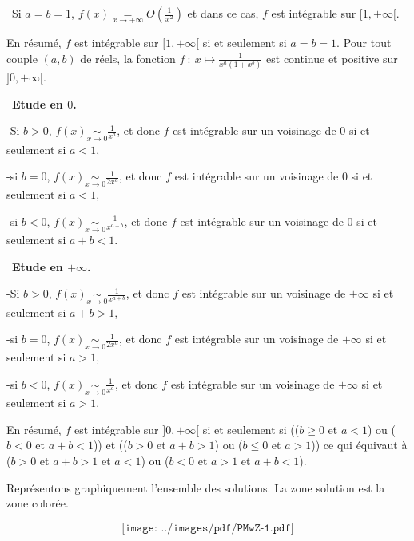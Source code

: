 {{\textbullet~Si $a = b = 1$, $f(x)\underset{x\rightarrow+\infty}{=}O\left(\frac{1}{x^2}\right)$ et dans ce cas, $f$ est intégrable sur $[1,+\infty[$.

En résumé, $f$ est intégrable sur $[1,+\infty[$ si et seulement si $a = b = 1$.
Pour tout couple $(a,b)$ de réels, la fonction $f~:~ x\mapsto\frac{1}{x^a(1+x^b)}$ est continue et positive sur $]0,+\infty[$.

\textbullet~\textbf{Etude en $0$.} 

-Si $b>0$, $f(x)\underset{x\rightarrow0}{\sim}\frac{1}{x^a}$, et donc $f$ est intégrable sur un voisinage de $0$ si et seulement si $a<1$,

-si $b=0$, $f(x)\underset{x\rightarrow0}{\sim}\frac{1}{2x^a}$, et donc $f$ est intégrable sur un voisinage de $0$ si et seulement si $a<1$,

-si $b<0$, $f(x)\underset{x\rightarrow0}{\sim}\frac{1}{x^{a+b}}$, et donc $f$ est intégrable sur un voisinage de $0$ si et seulement si $a+b<1$.

\textbullet~\textbf{Etude en $+\infty$.} 

-Si $b>0$, $f(x)\underset{x\rightarrow0}{\sim}\frac{1}{x^{a+b}}$, et donc $f$ est intégrable sur un voisinage de $+\infty$ si et seulement si $a+b>1$,

-si $b=0$, $f(x)\underset{x\rightarrow0}{\sim}\frac{1}{2x^a}$, et donc $f$ est intégrable sur un voisinage de $+\infty$ si et seulement si $a>1$,

-si $b<0$, $f(x)\underset{x\rightarrow0}{\sim}\frac{1}{x^{a}}$, et donc $f$ est intégrable sur un voisinage de $+\infty$ si et seulement si $a>1$.

En résumé, $f$ est intégrable sur $]0,+\infty[$ si et seulement si (($b\geqslant0$ et $a<1$) ou ($b<0$ et $a+b<1$)) et (($b>0$ et $a+b>1$) ou ($b\leqslant0$ et $a>1$)) ce qui équivaut à ($b>0$ et $a+b>1$ et $a<1$) ou ($b<0$ et $a>1$ et $a+b<1$).

Représentons graphiquement l'ensemble des solutions. La zone solution est la zone colorée.

$$\texttt{[image: ../images/pdf/PMwZ-1.pdf]}$$
}
}
